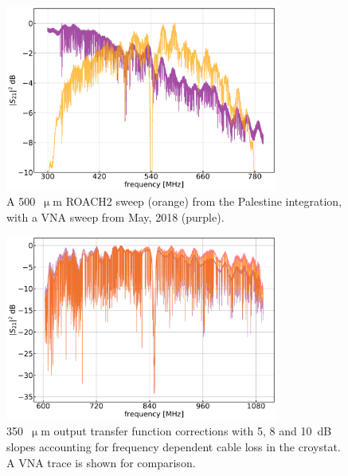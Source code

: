 \begin{figure}[!htbp]
\centering
\includegraphics[width=0.8\textwidth]{figures/blast_data/sweeps/500_VNA_overplot}
\caption[~A 500~ ROACH2 sweep from the Palestine integration, with a VNA sweep from May, 2018.]{A 500~$\upmu$m ROACH2 sweep (orange) from the Palestine integration, with a VNA sweep from May, 2018 (purple).}
\label{fig:VNA comp 500}
\end{figure}

\begin{figure}[!htbp]
\centering
\includegraphics[width=0.8\textwidth]{figures/blast_data/sweeps/trf_slopes}
\caption[~350~ output transfer function corrections with slopes of 5, 8 and 10~dB.]{350~$\upmu$m output transfer function corrections with 5, 8 and 10~dB slopes accounting for frequency dependent cable loss in the croystat. A VNA trace is shown for comparison.}
\label{fig:trf slopes}
\end{figure}

